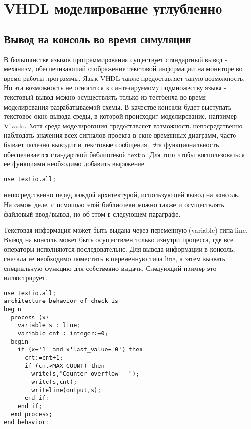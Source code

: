 \chapter{VHDL моделирование углубленно}

\section{Вывод на консоль во время симуляции}

В большинстве языков программирования существует стандартный вывод - механизм, обеспечивающий отображение текстовой информации на мониторе во время работы программы. Язык VHDL также предоставляет такую возможность. Но эта возможность не относится к синтезируемому подмножеству языка - текстовый вывод можно осуществлять только из тестбенча во время моделирования разрабатываемой схемы. В качестве консоли будет выступать текстовое окно вывода среды, в которой происходит моделирование, например Vivado. Хотя среда моделирования предоставляет возможность непосредственно наблюдать значения всех сигналов проекта в окне времянных диаграмм, часто бывает полезно выводит и текстовые сообщения. Эта функциональность обеспечивается стандартной библиотекой textio. Для того чтобы воспользоваться ее функциями необходимо добавить выражение

\begin{lstlisting}
use textio.all;
\end{lstlisting}
непосредственно перед каждой архитектурой, использующей вывод на консоль. На самом деле, с помощью этой библиотеки можно также и осуществлять файловый ввод/вывод, но об этом в следующем параграфе. 

Текстовая информация может быть выдана через переменную (variable) типа line. Вывод на консоль может быть осуществлен только изнутри процесса, где все операторы исполняются последовательно. Для вывода информации в консоль, сначала ее необходимо поместить в переменную типа line, а затем вызвать специальную функцию для собственно выдачи. Следующий пример это иллюстрирует.

\begin{lstlisting}[caption=Вывод в консоль, float]
use textio.all;
architecture behavior of check is
begin
  process (x)
    variable s : line;
    variable cnt : integer:=0;
  begin
    if (x='1' and x'last_value='0') then
      cnt:=cnt+1;
      if (cnt>MAX_COUNT) then
        write(s,"Counter overflow - ");
        write(s,cnt);
        writeline(output,s);
      end if;
    end if;
  end process;
end behavior;
\end{lstlisting}


